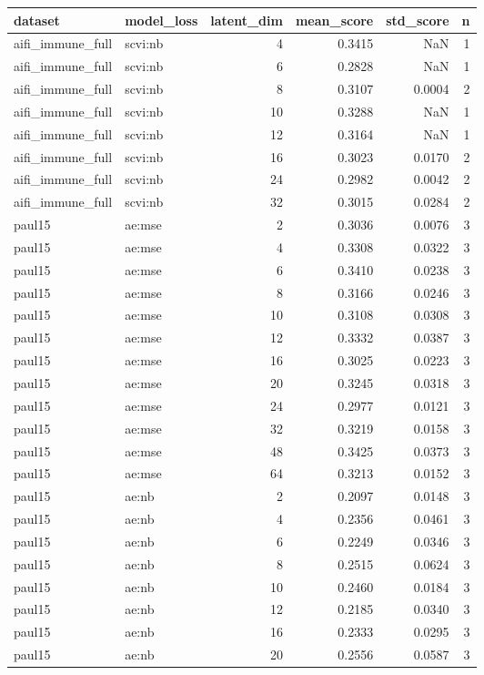\begin{tabular}{llrrrr}
\toprule
dataset & model\_loss & latent\_dim & mean\_score & std\_score & n \\
\midrule
aifi\_immune\_full & scvi:nb & 4 & 0.3415 & NaN & 1 \\
aifi\_immune\_full & scvi:nb & 6 & 0.2828 & NaN & 1 \\
aifi\_immune\_full & scvi:nb & 8 & 0.3107 & 0.0004 & 2 \\
aifi\_immune\_full & scvi:nb & 10 & 0.3288 & NaN & 1 \\
aifi\_immune\_full & scvi:nb & 12 & 0.3164 & NaN & 1 \\
aifi\_immune\_full & scvi:nb & 16 & 0.3023 & 0.0170 & 2 \\
aifi\_immune\_full & scvi:nb & 24 & 0.2982 & 0.0042 & 2 \\
aifi\_immune\_full & scvi:nb & 32 & 0.3015 & 0.0284 & 2 \\
paul15 & ae:mse & 2 & 0.3036 & 0.0076 & 3 \\
paul15 & ae:mse & 4 & 0.3308 & 0.0322 & 3 \\
paul15 & ae:mse & 6 & 0.3410 & 0.0238 & 3 \\
paul15 & ae:mse & 8 & 0.3166 & 0.0246 & 3 \\
paul15 & ae:mse & 10 & 0.3108 & 0.0308 & 3 \\
paul15 & ae:mse & 12 & 0.3332 & 0.0387 & 3 \\
paul15 & ae:mse & 16 & 0.3025 & 0.0223 & 3 \\
paul15 & ae:mse & 20 & 0.3245 & 0.0318 & 3 \\
paul15 & ae:mse & 24 & 0.2977 & 0.0121 & 3 \\
paul15 & ae:mse & 32 & 0.3219 & 0.0158 & 3 \\
paul15 & ae:mse & 48 & 0.3425 & 0.0373 & 3 \\
paul15 & ae:mse & 64 & 0.3213 & 0.0152 & 3 \\
paul15 & ae:nb & 2 & 0.2097 & 0.0148 & 3 \\
paul15 & ae:nb & 4 & 0.2356 & 0.0461 & 3 \\
paul15 & ae:nb & 6 & 0.2249 & 0.0346 & 3 \\
paul15 & ae:nb & 8 & 0.2515 & 0.0624 & 3 \\
paul15 & ae:nb & 10 & 0.2460 & 0.0184 & 3 \\
paul15 & ae:nb & 12 & 0.2185 & 0.0340 & 3 \\
paul15 & ae:nb & 16 & 0.2333 & 0.0295 & 3 \\
paul15 & ae:nb & 20 & 0.2556 & 0.0587 & 3 \\

\end{tabular}

